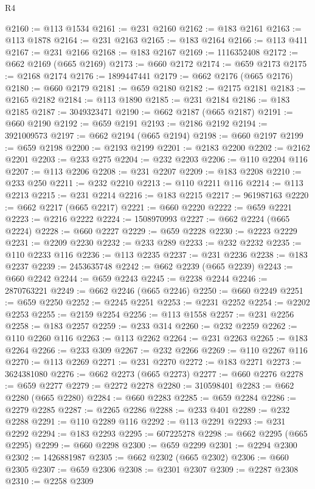 \begin{lexlean}{R4}
\begin{coremodule}
@2160 := @113 @1534
@2161 := @231 @2160
@2162 := @183 @2161
@2163 := @113 @1878
@2164 := @231 @2163
@2165 := @183 @2164
@2166 := @113 @411
@2167 := @231 @2166
@2168 := @183 @2167
@2169 := 1116352408
@2172 := @662 @2169 (@665 @2169)
@2173 := @660 @2172
@2174 := @659 @2173
@2175 := @2168 @2174
@2176 := 1899447441
@2179 := @662 @2176 (@665 @2176)
@2180 := @660 @2179
@2181 := @659 @2180
@2182 := @2175 @2181
@2183 := @2165 @2182
@2184 := @113 @1890
@2185 := @231 @2184
@2186 := @183 @2185
@2187 := 3049323471
@2190 := @662 @2187 (@665 @2187)
@2191 := @660 @2190
@2192 := @659 @2191
@2193 := @2186 @2192
@2194 := 3921009573
@2197 := @662 @2194 (@665 @2194)
@2198 := @660 @2197
@2199 := @659 @2198
@2200 := @2193 @2199
@2201 := @2183 @2200
@2202 := @2162 @2201
@2203 := @233 @275
@2204 := @232 @2203
@2206 := @110 @2204 @116
@2207 := @113 @2206
@2208 := @231 @2207
@2209 := @183 @2208
@2210 := @233 @250
@2211 := @232 @2210
@2213 := @110 @2211 @116
@2214 := @113 @2213
@2215 := @231 @2214
@2216 := @183 @2215
@2217 := 961987163
@2220 := @662 @2217 (@665 @2217)
@2221 := @660 @2220
@2222 := @659 @2221
@2223 := @2216 @2222
@2224 := 1508970993
@2227 := @662 @2224 (@665 @2224)
@2228 := @660 @2227
@2229 := @659 @2228
@2230 := @2223 @2229
@2231 := @2209 @2230
@2232 := @233 @289
@2233 := @232 @2232
@2235 := @110 @2233 @116
@2236 := @113 @2235
@2237 := @231 @2236
@2238 := @183 @2237
@2239 := 2453635748
@2242 := @662 @2239 (@665 @2239)
@2243 := @660 @2242
@2244 := @659 @2243
@2245 := @2238 @2244
@2246 := 2870763221
@2249 := @662 @2246 (@665 @2246)
@2250 := @660 @2249
@2251 := @659 @2250
@2252 := @2245 @2251
@2253 := @2231 @2252
@2254 := @2202 @2253
@2255 := @2159 @2254
@2256 := @113 @1558
@2257 := @231 @2256
@2258 := @183 @2257
@2259 := @233 @314
@2260 := @232 @2259
@2262 := @110 @2260 @116
@2263 := @113 @2262
@2264 := @231 @2263
@2265 := @183 @2264
@2266 := @233 @309
@2267 := @232 @2266
@2269 := @110 @2267 @116
@2270 := @113 @2269
@2271 := @231 @2270
@2272 := @183 @2271
@2273 := 3624381080
@2276 := @662 @2273 (@665 @2273)
@2277 := @660 @2276
@2278 := @659 @2277
@2279 := @2272 @2278
@2280 := 310598401
@2283 := @662 @2280 (@665 @2280)
@2284 := @660 @2283
@2285 := @659 @2284
@2286 := @2279 @2285
@2287 := @2265 @2286
@2288 := @233 @401
@2289 := @232 @2288
@2291 := @110 @2289 @116
@2292 := @113 @2291
@2293 := @231 @2292
@2294 := @183 @2293
@2295 := 607225278
@2298 := @662 @2295 (@665 @2295)
@2299 := @660 @2298
@2300 := @659 @2299
@2301 := @2294 @2300
@2302 := 1426881987
@2305 := @662 @2302 (@665 @2302)
@2306 := @660 @2305
@2307 := @659 @2306
@2308 := @2301 @2307
@2309 := @2287 @2308
@2310 := @2258 @2309

\end{coremodule}
\end{lexlean}
